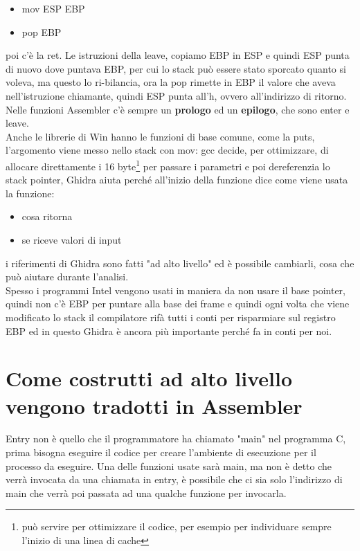 \documentclass[12pt, oneside]{extbook}
\begin{document}
\begin{itemize}
\item \textsf{mov ESP EBP}
\item \textsf{pop EBP}
\end{itemize}
poi c'è la \textsf{ret}. Le istruzioni della leave, copiamo EBP in ESP e quindi ESP punta di nuovo dove puntava EBP, per cui lo stack può essere stato sporcato quanto si voleva, ma questo lo ri-bilancia, ora la pop rimette in EBP il valore che aveva nell'istruzione chiamante, quindi ESP punta all'h, ovvero all'indirizzo di ritorno. Nelle funzioni Assembler c'è sempre un \textbf{prologo} ed un \textbf{epilogo}, che sono enter e leave.\\ Anche le librerie di Win hanno le funzioni di base comune, come la puts, l'argomento viene messo nello stack con \textsf{mov}: gcc decide, per ottimizzare, di allocare direttamente i 16 byte\footnote{può servire per ottimizzare il codice, per esempio per individuare sempre l'inizio di una linea di cache} per passare i parametri e poi dereferenzia lo stack pointer, Ghidra aiuta perché all'inizio della funzione dice come viene usata la funzione:
\begin{itemize}
\item cosa ritorna
\item se riceve valori di input
\end{itemize}
i riferimenti di Ghidra sono fatti "ad alto livello" ed è possibile cambiarli, cosa che può aiutare durante l'analisi.\\ Spesso i programmi Intel vengono usati in maniera da non usare il base pointer, quindi non c'è EBP per puntare alla base dei frame e quindi ogni volta che viene modificato lo stack il compilatore rifà tutti i conti per risparmiare sul registro EBP ed in questo Ghidra è ancora più importante perché fa in conti per noi.
\section{Come  costrutti ad alto livello vengono tradotti in Assembler}
Entry non è quello che il programmatore ha chiamato "main" nel programma C, prima bisogna eseguire il codice per creare l'ambiente di esecuzione per il processo da eseguire. Una delle funzioni usate sarà main, ma non è detto che verrà invocata da una chiamata in entry, è possibile che ci sia solo l'indirizzo di main che verrà poi passata ad una qualche funzione per invocarla. 
\end{document}
